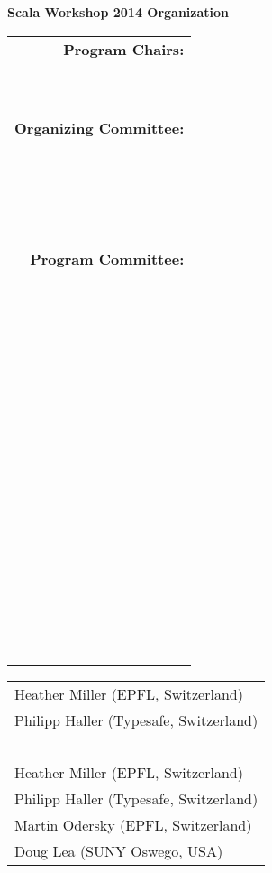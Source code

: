 \documentclass[10pt]{book}
\title{}
\date{}
\begin{document}
\thispagestyle{empty}


{\centering \LARGE \bf Scala Workshop 2014 Organization\par}

\vspace{0.5cm}

\begin{table}[ht]
\begin{minipage}[b]{0.35\linewidth}\centering
\begin{tabular}{r}
{\bf Program Chairs:}\\
~\\
~\\
{\bf Organizing Committee:}\\
~\\
~\\
~\\
~\\
{\bf Program Committee:}\\
~\\
~\\
~\\
~\\
~\\
~\\
~\\
~\\
~\\
~\\
~\\
~\\
~\\
~\\
~\\
\end{tabular}
\end{minipage}
\hspace{0.5cm}
\begin{minipage}[b]{0.55\linewidth}
\centering
\begin{tabular}{l}
Heather Miller (EPFL, Switzerland)\\
Philipp Haller (Typesafe, Switzerland)\\
~\\
Heather Miller (EPFL, Switzerland)\\
Philipp Haller (Typesafe, Switzerland)\\
Martin Odersky (EPFL, Switzerland)\\
Doug Lea (SUNY Oswego, USA)\\

\end{tabular}
\end{minipage}
\end{table}
\end{document}
